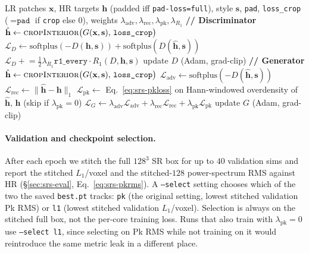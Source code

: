 \begin{algorithm}[H]
\caption{CMASS patch-GAN training step (one batch of cores)}
\label{alg:srs-train}
\begin{algorithmic}[1]
\Require LR patches $\mathbf x$, HR targets $\mathbf h$ (padded iff \texttt{pad-loss=full}),
         style $\mathbf s$, \texttt{pad}, \texttt{loss\_crop} ($=\texttt{pad}$ if \texttt{crop} else $0$),
         weights $\lambda_\text{adv},\lambda_\text{rec},\lambda_\text{pk},\lambda_{R_1}$
\Statex \textbf{// Discriminator}
\State $\hat{\mathbf h}\gets \textsc{cropInterior}\big(G(\mathbf x,\mathbf s),\,\texttt{loss\_crop}\big)$ 
\State $\mathcal L_D \gets \mathrm{softplus}({-}D(\mathbf h,\mathbf s)) + \mathrm{softplus}(D(\hat{\mathbf h},\mathbf s))$
 $\mathcal L_D \mathrel{+}= \tfrac12\lambda_{R_1}\texttt{r1\_every}\cdot R_1(D,\mathbf h,\mathbf s)$ \EndIf
\State update $D$ (Adam, grad-clip)
\Statex \textbf{// Generator}
\State $\hat{\mathbf h}\gets \textsc{cropInterior}\big(G(\mathbf x,\mathbf s),\,\texttt{loss\_crop}\big)$
\State $\mathcal L_\text{adv}\gets \mathrm{softplus}({-}D(\hat{\mathbf h},\mathbf s))$
\State $\mathcal L_\text{rec}\gets \lVert \hat{\mathbf h}-\mathbf h\rVert_1$
\State $\mathcal L_\text{pk}\gets$ Eq.~\ref{eq:srs-pkloss} on Hann-windowed overdensity of $\hat{\mathbf h}$, $\mathbf h$
       (skip if $\lambda_\text{pk}{=}0$)
\State $\mathcal L_G \gets \lambda_\text{adv}\mathcal L_\text{adv}+\lambda_\text{rec}\mathcal L_\text{rec}+\lambda_\text{pk}\mathcal L_\text{pk}$
\State update $G$ (Adam, grad-clip)
\end{algorithmic}
\end{algorithm}

\paragraph{Validation and checkpoint selection.} After each epoch we stitch the
full $128^3$ SR box for up to $40$ validation sims and report the stitched
$L_1$/voxel and the stitched-$128$ power-spectrum RMS against HR
(\S\ref{sec:srs-eval}, Eq.~\ref{eq:srs-pkrms}). A \texttt{--select} setting
chooses which of the two the saved \texttt{best.pt} tracks: \texttt{pk} (the
original setting, lowest stitched validation Pk RMS) or \texttt{l1} (lowest
stitched validation $L_1$/voxel). Selection is always on the stitched full box,
not the per-core training loss. Runs that also train with $\lambda_\text{pk}{=}0$
use \texttt{--select l1}, since selecting on Pk RMS while not training on it
would reintroduce the same metric leak in a different place.

